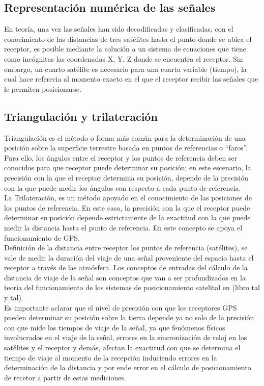 \subsection{Representación numérica de las señales}

En teoría, una vez las señales han sido decodificadas y clasificadas, con el conocimiento de las distancias de tres satélites hasta el punto donde se ubica el receptor, es posible mediante la solución a un sistema de ecuaciones que tiene como incógnitas las coordenadas X, Y, Z donde se encuentra el receptor. Sin embargo, un cuarto satélite es necesario para una cuarta variable (tiempo), la cual hace referecia al momento exacto en el que el receptor recibir las señales que le permiten posicionarse.



\subsection{Triangulación y trilateración}

Triangulación es el método o forma más común para la  determinación de una posición sobre la superficie terrestre basada en puntos de referencias o “faros”. Para ello, los ángulos entre el receptor y los puntos de referencia deben ser conocidos para que receptor puede determinar su posición; en este escenario, la precisión con la que el receptor determina su posición, depende de la precisión con la que puede medir los ángulos con respecto a cada punto de referencia.\\
 
La Trilateración, es un método apoyado en el conocimiento de las posiciones de los puntos de referencia. En este caso, la precisión con la que el receptor puede determinar su posición depende estrictamente de la exactitud con la que puede medir la distancia hasta el punto de referencia. En este concepto se apoya el funcionamiento de GPS.
\\
Definición de la distancia entre receptor los puntos de referencia (satélites),  se vale de medir la duración del viaje de una señal proveniente del espacio hasta el receptor a través de las atmósfera. Los conceptos de entradas del cálculo de la distancia de viaje de la señal son conceptos que van a ser profundizados en la teoría del funcionamiento de los sistemas de posicionamiento satelital en (libro tal y tal).\\

Es importante aclarar que el nivel de precisión con que los receptores GPS pueden determinar su posición sobre la tierra depende ya no solo de la precisión con que mide los tiempos de viaje de la señal, ya que fenómenos físicos involucrados en el viaje de la señal, errores en la sincronización de reloj en los satélites y el receptor y demás, afectan la exactitud con que se determina el tiempo de viaje al momento de la recepción induciendo errores en la determinación de la distancia y por ende error en el cálculo de posicionamiento de recetor a partir de estas mediciones.\\

